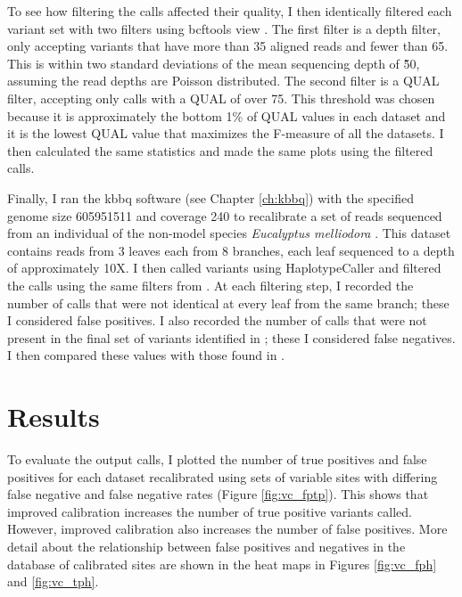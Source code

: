 \documentclass{report}
\begin{document}
\begin{outline}
\item To see how filtering the calls affected their quality, I then identically filtered each variant set with two filters using bcftools view \parencite{li_sequence_2009}. The first filter is a depth filter, only accepting variants that have more than 35 aligned reads and fewer than 65. This is within two standard deviations of the mean sequencing depth of \~50, assuming the read depths are Poisson distributed. The second filter is a QUAL filter, accepting only calls with a QUAL of over 75. This threshold was chosen because it is approximately the bottom 1\% of QUAL values in each dataset and it is the lowest QUAL value that maximizes the F-measure of all the datasets. I then calculated the same statistics and made the same plots using the filtered calls.


\item Finally, I ran the kbbq software (see Chapter \ref{ch:kbbq}) with the specified genome size 605951511 and coverage 240 to recalibrate a set of reads sequenced from an individual of the non-model species \textit{Eucalyptus melliodora} \parencite{orr_phylogenomic_2020}. This dataset contains reads from 3 leaves each from 8 branches, each leaf sequenced to a depth of approximately 10X. I then called variants using HaplotypeCaller and filtered the calls using the same filters from \cite{orr_phylogenomic_2020}. At each filtering step, I recorded the number of calls that were not identical at every leaf from the same branch; these I considered false positives. I also recorded the number of calls that were not present in the final set of variants identified in \cite{orr_phylogenomic_2020}; these I considered false negatives. I then compared these values with those found in \cite{orr_phylogenomic_2020}.

\end{outline}

\section{Results}
\begin{outline}
\item To evaluate the output calls, I plotted the number of true positives and false positives for each dataset recalibrated using sets of variable sites with differing false negative and false negative rates (Figure \ref{fig:vc_fptp}). This shows that improved calibration increases the number of true positive variants called. However, improved calibration also increases the number of false positives. More detail about the relationship between false positives and negatives in the database of calibrated sites are shown in the heat maps in Figures \ref{fig:vc_fph} and \ref{fig:vc_tph}.
\end{outline}
\end{document}
